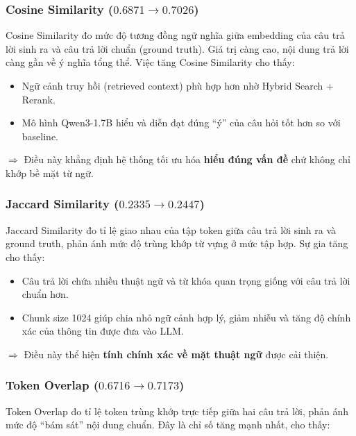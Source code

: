 \subsubsection*{Cosine Similarity ($0.6871 \rightarrow 0.7026$)}

Cosine Similarity đo mức độ tương đồng ngữ nghĩa giữa embedding của câu trả lời sinh ra và
câu trả lời chuẩn (ground truth). Giá trị càng cao, nội dung trả lời càng gần về ý nghĩa tổng
thể. Việc tăng Cosine Similarity cho thấy:

\begin{itemize}
    \item Ngữ cảnh truy hồi (retrieved context) phù hợp hơn nhờ Hybrid Search + Rerank.
    \item Mô hình Qwen3-1.7B hiểu và diễn đạt đúng ``ý'' của câu hỏi tốt hơn so với baseline.
\end{itemize}

$\Rightarrow$ Điều này khẳng định hệ thống tối ưu hóa \textbf{hiểu đúng vấn đề} chứ không chỉ khớp bề mặt từ ngữ.

\subsubsection*{Jaccard Similarity ($0.2335 \rightarrow 0.2447$)}

Jaccard Similarity đo tỉ lệ giao nhau của tập token giữa câu trả lời sinh ra và ground truth,
phản ánh mức độ trùng khớp từ vựng ở mức tập hợp. Sự gia tăng cho thấy:

\begin{itemize}
    \item Câu trả lời chứa nhiều thuật ngữ và từ khóa quan trọng giống với câu trả lời chuẩn hơn.
    \item Chunk size 1024 giúp chia nhỏ ngữ cảnh hợp lý, giảm nhiễu và tăng độ chính xác của
    thông tin được đưa vào LLM.
\end{itemize}

$\Rightarrow$ Điều này thể hiện \textbf{tính chính xác về mặt thuật ngữ} được cải thiện.

\subsubsection*{Token Overlap ($0.6716 \rightarrow 0.7173$)}

Token Overlap đo tỉ lệ token trùng khớp trực tiếp giữa hai câu trả lời, phản ánh mức độ ``bám
sát'' nội dung chuẩn. Đây là chỉ số tăng mạnh nhất, cho thấy:

